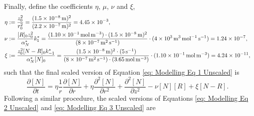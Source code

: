 \documentclass{article}
\begin{document}
Finally, define the coefficients $\eta$, $\mu$, $\nu$ and $\xi$, 
\begin{align*}
    \eta &:= \frac{z_0^2}{r_0^2} = \frac{(\SI{1.5d-8}{\meter})^2}{(\SI{2.2d-7}{\meter})^2} = \SI{4.45d-3}{}, \\
    \nu &:= \frac{[R]_0 z_0^2}{\alpha_N^*} k_1^* = \frac{(\SI{1.10d-1}{\mol\per\cubic\meter})\cdot(\SI{1.5d-8}{\meter})^2}{(\SI{8d-7}{\square\meter\per\second})}\cdot (\SI{4d3}{\cubic\meter\per\mol\per\second}) = \SI{1.24d-7}{}, \\
    \xi &:= \frac{ z_0^2 [N-R]_0 k_{-1}^*}{\alpha_N^* [N]_0} =  \frac{(\SI{1.5d-8}{\meter})^2\cdot(\SI{5}{\per\second})}{(\SI{8d-7}{\square\meter\per\second})\cdot (\SI{3.65}{\mol\per\cubic\meter})}\cdot(\SI{1.10d-1}{\mol\per\cubic\meter})  = \SI{4.24d-11}{},
\end{align*}
such that the final scaled version of Equation \eqref{eq: Modelling Eq 1 Unscaled} is
\begin{equation}
    \frac{\partial [N]}{\partial t} = 
    \eta \frac{1}{r} \frac{\partial [N]}{\partial r} +\eta  \frac{\partial^2 [N]}{\partial r^2}  +  \frac{\partial^2 [N]}{\partial z^2} -  \nu [N] [R] +  \xi [N-R].
    \label{skalert_sylinder2}
\end{equation}
Following a similar procedure, the scaled versions of Equations \eqref{eq: Modelling Eq 2  Unscaled} and \eqref{eq: Modelling Eq 3 Unscaled} are %
\end{document}
